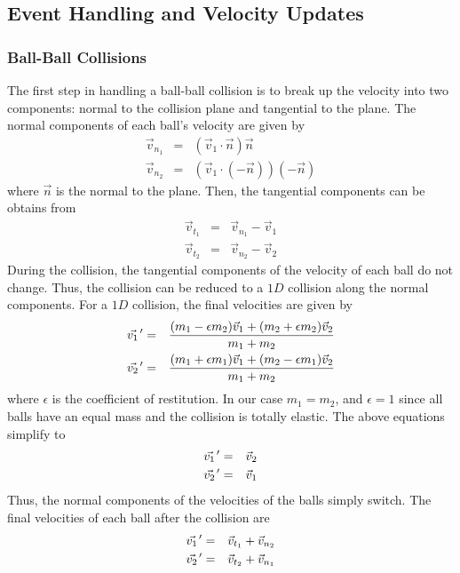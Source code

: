     \subsection{Event Handling and Velocity Updates}
        \subsubsection{Ball-Ball Collisions}
        The first step in handling a ball-ball collision is to break up the velocity into two components: normal to the collision plane
        and tangential to the plane. The normal components of each ball's velocity are given by
        \begin{eqnarray}
            \vec v_{n_1} &=& (\vec v_1 \cdot \vec n) \vec n       \nonumber \\
            \vec v_{n_2} &=& (\vec v_1 \cdot (-\vec n)) (-\vec n) \nonumber
        \end{eqnarray}
        where $\vec n$ is the normal to the plane. Then, the tangential components can be obtains from
        \begin{eqnarray}
            \vec v_{t_1} &=& \vec v_{n_1} - \vec v_1    \nonumber   \\
            \vec v_{t_2} &=& \vec v_{n_2} - \vec v_2    \nonumber
        \end{eqnarray}
        During the collision, the tangential components of the velocity of each ball do not change. Thus, the collision can be
        reduced to a $1D$ collision along the normal components. For a $1D$ collision, the final velocities are given by
        \begin{eqnarray}
            \pvec{v_1}' &=& \frac{(m_1 - \epsilon m_2) \vec v_1 + (m_2 + \epsilon m_2) \vec v_2}{m_1 + m_2}   \nonumber \\
            \pvec{v_2}' &=& \frac{(m_1 + \epsilon m_1) \vec v_1 + (m_2 - \epsilon m_1) \vec v_2}{m_1 + m_2}   \nonumber
        \end{eqnarray}
        where $\epsilon$ is the coefficient of restitution. In our case $m_1 = m_2$, and $\epsilon = 1$ since all balls have
        an equal mass and the collision is totally elastic. The above equations simplify to
        \begin{eqnarray}
            \pvec{v_1}' &=& \vec v_2    \nonumber   \\
            \pvec{v_2}' &=& \vec v_1    \nonumber
        \end{eqnarray}
        Thus, the normal components of the velocities of the balls simply switch. The final velocities of each ball after the collision are
        \begin{eqnarray}
            \pvec{v_1}' &=& \vec v_{t_1} + \vec v_{n_2} \nonumber   \\
            \pvec{v_2}' &=& \vec v_{t_2} + \vec v_{n_1} \label{equ:after_ball_ball}
        \end{eqnarray}
        
